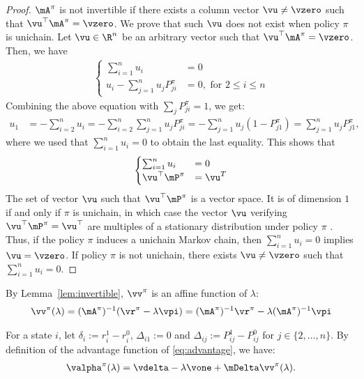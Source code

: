 \begin{proof}
    $\mA^\pi$ is not invertible if there exists a column vector $\vu\neq\vzero$ such that $\vu^\top \mA^\pi=\vzero$.
    We prove that such $\vu$ does not exist when policy $\pi$ is unichain.
    Let $\vu\in\R^n$ be an arbitrary vector such that $\vu^\top \mA^\pi=\vzero$.
    Then, we have
    \begin{align*}
        \begin{cases}
            \sum_{i=1}^{n}u_i &= 0 \\
            u_i-\sum_{j=1}^{n}u_jP_{ji}^\pi &= 0, \text{ for } 2\le i\le n
        \end{cases}
    \end{align*}
    Combining the above equation with $\sum_j P^\pi_{ji}=1$, we get:
    \begin{align*}
        u_1 &= -\sum_{i=2}^n u_i
        =-\sum_{i=2}^n\sum_{j=1}^n u_j P^\pi_{ji}
        =-\sum_{j=1}^n u_j (1-P^\pi_{j1})
        = \sum_{j=1}^n u_j P^\pi_{j1},
    \end{align*}
    where we used that $\sum_{i=1}^{n}u_i=0$ to obtain the last equality.  
    This shows that 
    \begin{align*}
        \begin{cases}
            \sum_{i=1}^{n}u_i &= 0 \\
            \vu^\top\mP^\pi &=\vu^T
        \end{cases}
    \end{align*}
    The set of vector $\vu$ such that $\vu^\top\mP^\pi$ is a vector space. It is of dimension $1$ if and only if $\pi$ is unichain, in which case the vector $\vu$ verifying $\vu^\top\mP^\pi=\vu^\top$ are multiples of a stationary distribution under policy $\pi$ \cite{puterman2014markov}. Thus, if the policy $\pi$ induces a unichain Markov chain, then $\sum_{i=1}^{n}u_i = 0$ implies $\vu = \vzero$. If policy $\pi$ is not unichain, there exists $\vu\ne\vzero$ such that $\sum_{i=1}^{n}u_i = 0$.
\end{proof}

By Lemma~\ref{lem:invertible}, $\vv^{\pi}$ is an affine function of $\lambda$:
\begin{align}
    \label{eq:h is linear}
    \vv^{\pi}(\lambda) = (\mA^{\pi})^{-1}(\vr^{\pi} - \lambda \vpi) =(\mA^{\pi})^{-1}\vr^\pi - \lambda (\mA^{\pi})^{-1}\vpi
\end{align}

For a state $i$, let $\delta_i:=r^1_i - r^0_i$, $\Delta_{i1}:=0$ and $\Delta_{ij}:=P^1_{ij}-P^0_{ij}$ for $j\in\{2,\dots, n\}$. By definition of the advantage function of \eqref{eq:advantage}, we have: 
\begin{align*}
    \valpha^\pi(\lambda)=\vdelta -\lambda\vone +\mDelta\vv^\pi(\lambda).
\end{align*}


